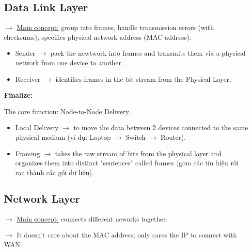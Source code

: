 \subsection{Data Link Layer}

\noindent
$\rightarrow$ \underline{Main concept:} group into frames, handle transmission errors (with checksums), specifies physical network address (MAC address).
\medskip

\begin{itemize}
    \item Sender $\rightarrow$ pack the newtwork into frames and transmits them via a physical network from one device to another.
    \item Receiver $\rightarrow$ identifies frames in the bit stream from the Physical Layer.
\end{itemize}
\medskip

\noindent
\textbf{Finalize:}
\medskip

\noindent
The core function: Node-to-Node Delivery.

\begin{itemize}
    \item Local Delivery $\rightarrow$ to move the data between 2 devices connected to the same physical medium (ví dụ: Laptop $\rightarrow$ Switch $\rightarrow$ Router).
    \item Framing $\rightarrow$ takes the raw stream of bits from the physical layer and organizes them into distinct "sentences" called frames (gom các tín hiệu rời rạc thành các gói dữ liệu).
\end{itemize}
\medskip


\subsection{Network Layer}

\noindent
$\rightarrow$ \underline{Main concept:} connects different neworks together.
\medskip

\noindent
$\rightarrow$ It doesn't care about the MAC address; only cares the IP to connect with WAN.
\medskip

